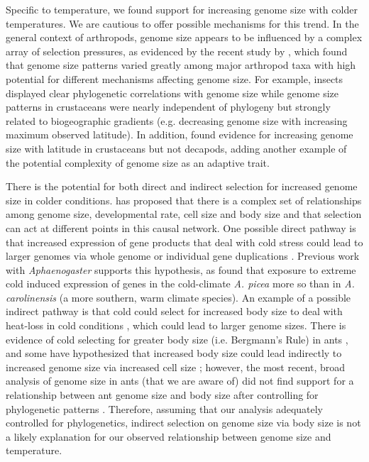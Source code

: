\documentclass[fleqn,10pt,lineno]{wlpeerj} %
\begin{document}
Specific to temperature, we found support for increasing genome size
with colder temperatures. We are cautious to offer possible mechanisms
for this trend. In the general context of arthropods, genome size
appears to be influenced by a complex array of selection pressures, as
evidenced by the recent study by \citet{Alfsnes2017}, which found that
genome size patterns varied greatly among major arthropod taxa with
high potential for different mechanisms affecting genome size. For
example, insects displayed clear phylogenetic correlations with genome
size while genome size patterns in crustaceans were nearly independent
of phylogeny but strongly related to biogeographic gradients
(e.g. decreasing genome size with increasing maximum observed
latitude). In addition, \citet{Hultgren2018} found evidence for
increasing genome size with latitude in crustaceans but not decapods,
adding another example of the potential complexity of genome size as
an adaptive trait.

There is the potential for both direct and indirect selection for
increased genome size in colder conditions. \citet{Hessen2010} has
proposed that there is a complex set of relationships among genome
size, developmental rate, cell size and body size and that selection
can act at different points in this causal network. One possible
direct pathway is that increased expression of gene products that deal
with cold stress could lead to larger genomes via whole genome or
individual gene duplications \citet{Dufresne2011}. Previous work with
\textit{Aphaenogaster} supports this hypothesis, as
\citet{Stanton-Geddes} found that exposure to extreme cold induced
expression of genes in the cold-climate \textit{A. picea} more so than
in \textit{A. carolinensis} (a more southern, warm climate species).
An example of a possible indirect pathway is that cold could select
for increased body size to deal with heat-loss in cold conditions
\citep{Brown2004}, which could lead to larger genome sizes. There is
evidence of cold selecting for greater body size (i.e. Bergmann's
Rule) in ants \citep{Heinze2003, Bernadou2016}, and some have
hypothesized that increased body size could lead indirectly to
increased genome size via increased cell size \citep{RyanGregory2005};
however, the most recent, broad analysis of genome size in ants (that
we are aware of) did not find support for a relationship between ant
genome size and body size after controlling for phylogenetic patterns
\citep{Tsutsui2008a}. Therefore, assuming that our analysis adequately
controlled for phylogenetics, indirect selection on genome size via
body size is not a likely explanation for our observed relationship
between genome size and temperature.
\end{document}
